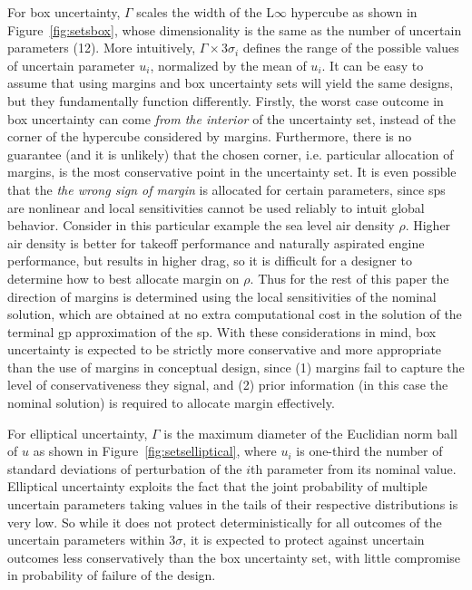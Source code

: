 For box uncertainty,
$\Gamma$ scales the width of the L$\infty$ hypercube as shown in Figure~\ref{fig:setsbox},
whose dimensionality is the same as the number of uncertain parameters (12).
More intuitively, $\Gamma \times 3\sigma_i$ defines the range of the possible values of uncertain parameter $u_i$,
normalized by the mean of $u_i$.
It can be easy to assume that using margins and box uncertainty sets will yield the same designs,
but they fundamentally function differently.
Firstly, the worst case outcome in box uncertainty can come \emph{from the interior} of the uncertainty
set, instead of the corner of the hypercube considered
by margins. Furthermore, there is no guarantee (and it is unlikely)
that the chosen corner, i.e. particular allocation of margins,
is the most conservative point in the uncertainty set.
It is even possible that the \emph{the wrong sign of margin} is allocated for certain parameters,
since \gls{sp}s are nonlinear and local sensitivities cannot be used reliably to intuit global behavior. {\color{blue}Consider
in this particular example the sea level air density $\rho$.
Higher air density is better for takeoff performance and naturally aspirated engine performance,
but results in higher drag, so it is difficult
for a designer to determine how to best allocate margin on $\rho$.} Thus for the rest
of this paper the direction of margins is determined using the local sensitivities of the nominal solution,
which are obtained at no extra computational cost in the solution of the terminal \gls{gp} approximation of the \gls{sp}.
With these considerations in mind, box uncertainty is expected to be strictly more conservative
and more appropriate than the use of margins
in conceptual design, since (1) margins fail to capture the level of conservativeness they signal, and (2) prior
information (in this case the nominal solution) is required to allocate margin effectively.

For elliptical uncertainty, $\Gamma$ is the maximum diameter of the Euclidian norm
ball of $u$ as shown in Figure~\ref{fig:setselliptical},
where $u_i$ is {\color{blue}one-third} the number of standard deviations of perturbation of the
$i$th parameter from its nominal value.
Elliptical uncertainty exploits the fact that the joint probability of
multiple uncertain parameters taking values in the tails of their respective distributions is
very low. So while it does not protect deterministically for all outcomes of the uncertain
parameters within $3\sigma$, it is expected to protect against uncertain outcomes
less conservatively than the box uncertainty set, with little compromise in probability of failure
of the design.
